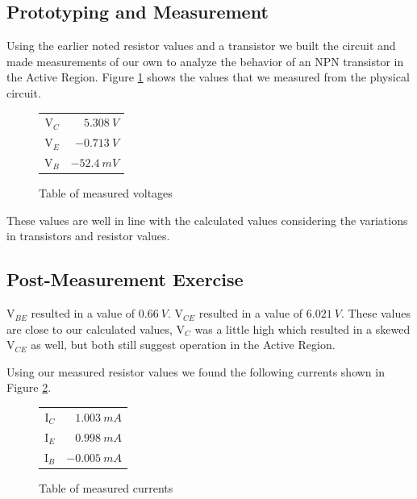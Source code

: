 \documentclass{article}
\begin{document}
\subsection{Prototyping and Measurement}

Using the earlier noted resistor values and a transistor
we built the circuit and made measurements of our own
to analyze the behavior of an NPN transistor in the
Active Region. Figure \ref{table:activeTableMeas} shows
the values that we measured from the physical circuit.

\begin{figure}[h!]
  \begin{center}
    \begin{tabular}{r|r}
      V$_C$ & $\SI{5.308}{V}$ \\
      V$_E$ & $\SI{-0.713}{V}$ \\
      V$_B$ & $\SI{-52.4}{mV}$ \\

    \end{tabular}
  \end{center}
  \caption{Table of measured voltages}
  \label{table:activeTableMeas}
\end{figure}

These values are well in line with the calculated values
considering the variations in transistors and resistor
values.

\subsection{Post-Measurement Exercise}

V$_{BE}$ resulted in a value of $\SI{0.66}{V}$.
V$_{CE}$ resulted in a value of $\SI{6.021}{V}$.
These values are close to our calculated values,
V$_C$ was a little high which resulted in a skewed
V$_{CE}$ as well, but both still suggest operation in
the Active Region.

Using our measured resistor values we found 
the following currents shown in Figure
\ref{table:activeTableMeasCurrent}.

\begin{figure}[h!]
  \begin{center}
    \begin{tabular}{r|r}
      I$_C$ & $\SI{1.003}{mA}$ \\
      I$_E$ & $\SI{0.998}{mA}$ \\
      I$_B$ & $\SI{-0.005}{mA}$ \\

    \end{tabular}
  \end{center}
  \caption{Table of measured currents}
  \label{table:activeTableMeasCurrent}
\end{figure}
\end{document}
